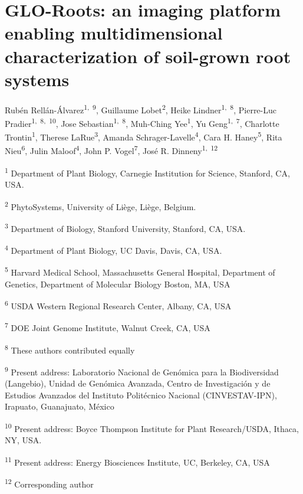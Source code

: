 \documentclass[]{article}
\date{}
\begin{document}
\section{GLO-Roots: an imaging platform enabling multidimensional
characterization of soil-grown root
systems}\label{glo-roots-an-imaging-platform-enabling-multidimensional-characterization-of-soil-grown-root-systems}

Rubén Rellán-Álvarez\textsuperscript{1,~9}, Guillaume
Lobet\textsuperscript{2}, Heike Lindner\textsuperscript{1,~8},
Pierre-Luc Pradier\textsuperscript{1,~8,~10}, Jose
Sebastian\textsuperscript{1,~8}, Muh-Ching Yee\textsuperscript{1}, Yu
Geng\textsuperscript{1,~7}, Charlotte Trontin\textsuperscript{1},
Therese LaRue\textsuperscript{3}, Amanda
Schrager-Lavelle\textsuperscript{4}, Cara H. Haney\textsuperscript{5},
Rita Nieu\textsuperscript{6}, Julin Maloof\textsuperscript{4}, John P.
Vogel\textsuperscript{7}, José R. Dinneny\textsuperscript{1,~12}

\textsuperscript{1} Department of Plant Biology, Carnegie Institution
for Science, Stanford, CA, USA.

\textsuperscript{2} PhytoSystems, University of Liège, Liège, Belgium.

\textsuperscript{3} Department of Biology, Stanford University,
Stanford, CA, USA.

\textsuperscript{4} Department of Plant Biology, UC Davis, Davis, CA,
USA.

\textsuperscript{5} Harvard Medical School, Massachusetts General
Hospital, Department of Genetics, Department of Molecular Biology
Boston, MA, USA

\textsuperscript{6} USDA Western Regional Research Center, Albany, CA,
USA

\textsuperscript{7} DOE Joint Genome Institute, Walnut Creek, CA, USA

\textsuperscript{8} These authors contributed equally

\textsuperscript{9} Present address: Laboratorio Nacional de Genómica
para la Biodiversidad (Langebio), Unidad de Genómica Avanzada, Centro de
Investigación y de Estudios Avanzados del Instituto Politécnico Nacional
(CINVESTAV-IPN), Irapuato, Guanajuato, México

\textsuperscript{10} Present address: Boyce Thompson Institute for Plant
Research/USDA, Ithaca, NY, USA.

\textsuperscript{11} Present address: Energy Biosciences Institute, UC,
Berkeley, CA, USA

\textsuperscript{12} Corresponding author
\end{document}
